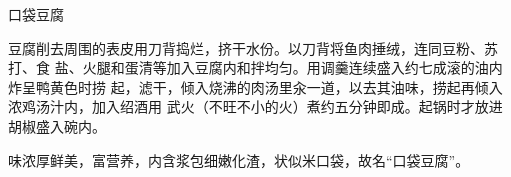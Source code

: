 %
%
%
%
%
%
%
\begin{recipe}{口袋豆腐}

\ingredients


\preparation

豆腐削去周围的表皮用刀背捣烂，挤干水份。以刀背将鱼肉捶绒，连同豆粉、苏打、食
盐、火腿和蛋清等加入豆腐内和拌均匀。用调羹连续盛入约七成滚的油内炸呈鸭黄色时捞
起，滤干，倾入烧沸的肉汤里汆一道，以去其油味，捞起再倾入浓鸡汤汁内，加入绍酒用
武火（不旺不小的火）煮约五分钟即成。起锅时才放进胡椒盛入碗内。

\features

味浓厚鲜美，富营养，内含浆包细嫩化渣，状似米口袋，故名“口袋豆腐”。

\end{recipe}

